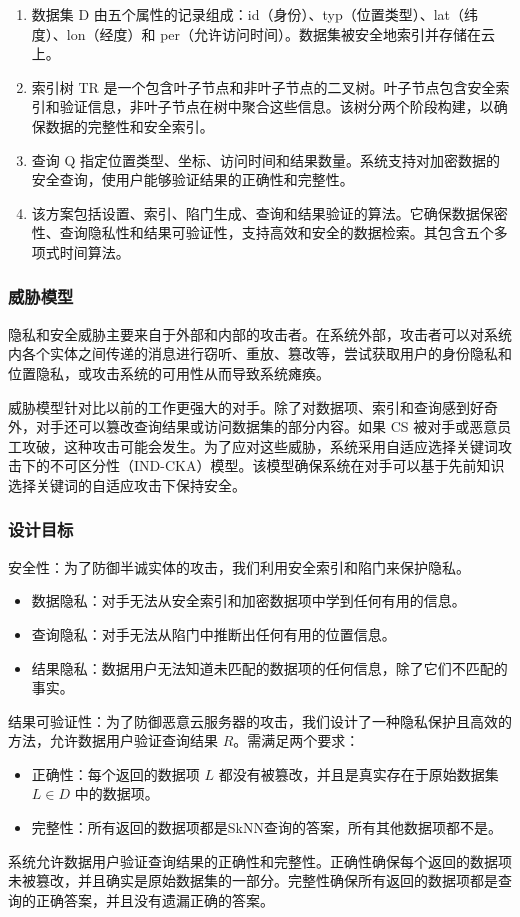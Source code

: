 \documentclass{cumcmthesis}
\numberwithin{equation}{section} %
\numberwithin{figure}{section} %
\numberwithin{table}{section} %
\begin{document}
\begin{enumerate}
    \item \textbf{\bfseries{}}数据集 D 由五个属性的记录组成：id（身份）、typ（位置类型）、lat（纬度）、lon（经度）和 per（允许访问时间）。数据集被安全地索引并存储在云上。
    \item \textbf{\bfseries{}}索引树 TR 是一个包含叶子节点和非叶子节点的二叉树。叶子节点包含安全索引和验证信息，非叶子节点在树中聚合这些信息。该树分两个阶段构建，以确保数据的完整性和安全索引。
    \item \textbf{\bfseries{}}查询 Q 指定位置类型、坐标、访问时间和结果数量。系统支持对加密数据的安全查询，使用户能够验证结果的正确性和完整性。
    \item \textbf{\bfseries{}}该方案包括设置、索引、陷门生成、查询和结果验证的算法。它确保数据保密性、查询隐私性和结果可验证性，支持高效和安全的数据检索。其包含五个多项式时间算法。
\end{enumerate}

\subsubsection{威胁模型}

	隐私和安全威胁主要来自于外部和内部的攻击者。在系统外部，攻击者可以对系统内各个实体之间传递的消息进行窃听、重放、篡改等，尝试获取用户的身份隐私和位置隐私，或攻击系统的可用性从而导致系统瘫痪。

	威胁模型针对比以前的工作更强大的对手。除了对数据项、索引和查询感到好奇外，对手还可以篡改查询结果或访问数据集的部分内容。如果 CS 被对手或恶意员工攻破，这种攻击可能会发生。为了应对这些威胁，系统采用自适应选择关键词攻击下的不可区分性（IND-CKA）模型。该模型确保系统在对手可以基于先前知识选择关键词的自适应攻击下保持安全。

\subsubsection{设计目标}

安全性：为了防御半诚实体的攻击，我们利用安全索引和陷门来保护隐私。
\begin{itemize}
    \item 数据隐私：对手无法从安全索引和加密数据项中学到任何有用的信息。
    \item 查询隐私：对手无法从陷门中推断出任何有用的位置信息。
    \item 结果隐私：数据用户无法知道未匹配的数据项的任何信息，除了它们不匹配的事实。
\end{itemize}
结果可验证性：为了防御恶意云服务器的攻击，我们设计了一种隐私保护且高效的方法，允许数据用户验证查询结果 $R$。需满足两个要求：
\begin{itemize}
    \item 正确性：每个返回的数据项 $L$ 都没有被篡改，并且是真实存在于原始数据集 $L\in D$ 中的数据项。
    \item 完整性：所有返回的数据项都是SkNN查询的答案，所有其他数据项都不是。
\end{itemize}
系统允许数据用户验证查询结果的正确性和完整性。正确性确保每个返回的数据项未被篡改，并且确实是原始数据集的一部分。完整性确保所有返回的数据项都是查询的正确答案，并且没有遗漏正确的答案。
\end{document}
